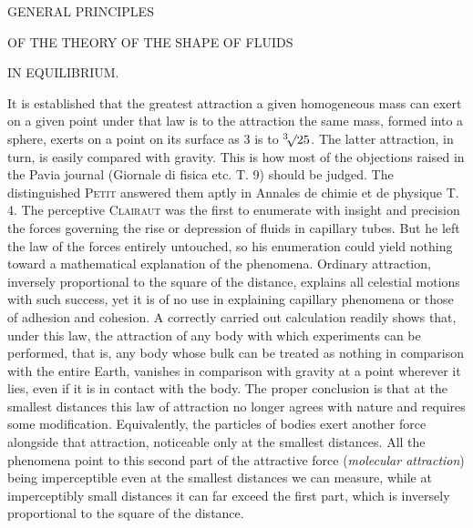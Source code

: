 \renewcommand{\Article}[1]{\par\medskip\Needspace{4\baselineskip}\pdfbookmark[1]{Art. #1}{fluidorum-art-#1}\centerline{\textbf{#1.}}\nobreak\smallskip}
\par\medskip
\centerline{GENERAL PRINCIPLES}
\centerline{OF THE THEORY OF THE SHAPE OF FLUIDS}
\centerline{IN EQUILIBRIUM.}
\medskip
\expandafter\def\csname HistoricalNoteText4\endcsname{It is established that the greatest attraction a given homogeneous mass can exert on a given point under that law is to the attraction the same mass, formed into a sphere, exerts on a point on its surface as $3$ is to $\BareRoot[3]{25}$. The latter attraction, in turn, is easily compared with gravity.}
\expandafter\def\csname HistoricalNoteText5\endcsname{This is how most of the objections raised in the Pavia journal (Giornale di fisica etc. T. 9) should be judged. The distinguished \textsc{Petit} answered them aptly in Annales de chimie et de physique T. 4.}
The perceptive \textsc{Clairaut} was the first to enumerate with insight and precision the forces governing the rise or depression of fluids in capillary tubes. But he left the law of the forces entirely untouched, so his enumeration could yield nothing toward a mathematical explanation of the phenomena. Ordinary attraction, inversely proportional to the square of the distance, explains all celestial motions with such success, yet it is of no use in explaining capillary phenomena or those of adhesion and cohesion. A correctly carried out calculation readily shows that, under this law, the attraction of any body with which experiments can be performed, that is, any body whose bulk can be treated as nothing in comparison with the entire Earth, vanishes in comparison with gravity at a point wherever it lies, even if it is in contact with the body. The proper conclusion is that at the smallest distances this law of attraction no longer agrees with nature and requires some modification. Equivalently, the particles of bodies exert another force alongside that attraction, noticeable only at the smallest distances. All the phenomena point to this second part of the attractive force (\textit{molecular attraction}) being imperceptible even at the smallest distances we can measure, while at imperceptibly small distances it can far exceed the first part, which is inversely proportional to the square of the distance.

